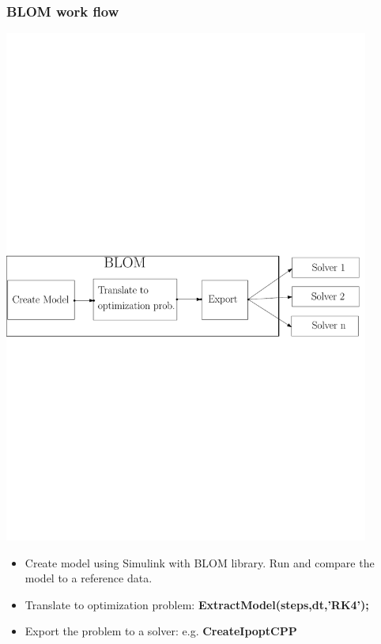 \documentclass[mathserif]{beamer}
\begin{document}
\begin{frame}
\frametitle{BLOM work flow}
\includegraphics[width=0.9\textwidth]{Flowdgrm}

\begin{itemize}
\item Create model using Simulink with BLOM library. Run and compare the model
  to a reference data. 
\item Translate to optimization problem: {\bf ExtractModel(steps,dt,'RK4');}
\item Export the problem to a solver: e.g. {\bf CreateIpoptCPP }
\end{itemize}

\end{frame}
\end{document}
